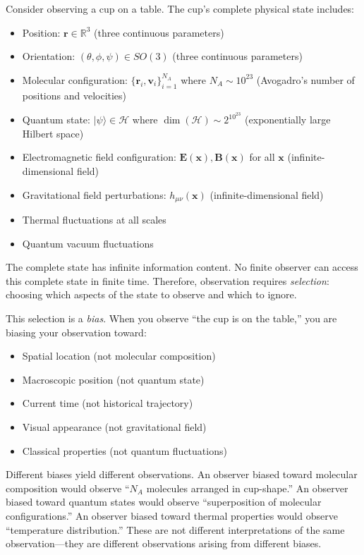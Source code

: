 \documentclass[twocolumn,10pt]{article}
\theoremstyle{definition}
\theoremstyle{remark}
\begin{document}
\vspace{0.2cm}
\noindent Consider observing a cup on a table. The cup's complete physical state includes:
\begin{itemize}
\item Position: $\mathbf{r} \in \mathbb{R}^3$ (three continuous parameters)
\item Orientation: $(\theta, \phi, \psi) \in SO(3)$ (three continuous parameters)
\item Molecular configuration: $\{\mathbf{r}_i, \mathbf{v}_i\}_{i=1}^{N_A}$ where $N_A \sim 10^{23}$ (Avogadro's number of positions and velocities)
\item Quantum state: $|\psi\rangle \in \mathcal{H}$ where $\dim(\mathcal{H}) \sim 2^{10^{23}}$ (exponentially large Hilbert space)
\item Electromagnetic field configuration: $\mathbf{E}(\mathbf{x}), \mathbf{B}(\mathbf{x})$ for all $\mathbf{x}$ (infinite-dimensional field)
\item Gravitational field perturbations: $h_{\mu\nu}(\mathbf{x})$ (infinite-dimensional field)
\item Thermal fluctuations at all scales
\item Quantum vacuum fluctuations
\end{itemize}

\noindent The complete state has infinite information content. No finite observer can access this complete state in finite time. Therefore, observation requires \textit{selection}: choosing which aspects of the state to observe and which to ignore.

\vspace{0.2cm}
\noindent This selection is a \textit{bias}. When you observe ``the cup is on the table,'' you are biasing your observation toward:
\begin{itemize}
\item Spatial location (not molecular composition)
\item Macroscopic position (not quantum state)
\item Current time (not historical trajectory)
\item Visual appearance (not gravitational field)
\item Classical properties (not quantum fluctuations)
\end{itemize}

\noindent Different biases yield different observations. An observer biased toward molecular composition would observe ``$N_A$ molecules arranged in cup-shape.'' An observer biased toward quantum states would observe ``superposition of molecular configurations.'' An observer biased toward thermal properties would observe ``temperature distribution.'' These are not different interpretations of the same observation—they are different observations arising from different biases.
\end{document}
